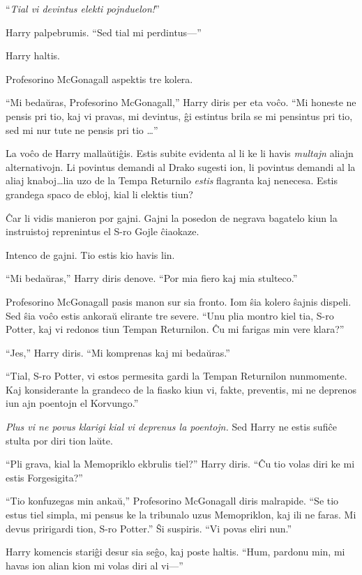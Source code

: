 ``\emph{Tial vi devintus elekti pojnduelon!}''

Harry palpebrumis. ``Sed tial mi perdintus—''

Harry haltis.

Profesorino McGonagall aspektis tre kolera.

``Mi bedaŭras, Profesorino McGonagall,'' Harry diris per eta
voĉo. ``Mi honeste ne pensis pri tio, kaj vi pravas, mi devintus, ĝi
estintus brila se mi pensintus pri tio, sed mi nur tute ne pensis pri
tio \ldots''

La voĉo de Harry mallaŭtiĝis. Estis subite evidenta al li ke li havis
\emph{multajn} aliajn alternativojn. Li povintus demandi al Drako
sugesti ion, li povintus demandi al la aliaj knaboj\ldots lia uzo de
la Tempa Returnilo \emph{estis} flagranta kaj nenecesa. Estis grandega
spaco de ebloj, kial li elektis tiun?

Ĉar li vidis manieron por gajni. Gajni la posedon de negrava bagatelo
kiun la instruistoj reprenintus el S-ro Gojle ĉiaokaze.

Intenco de gajni. Tio estis kio havis lin.

``Mi bedaŭras,'' Harry diris denove. ``Por mia fiero kaj mia stulteco.''

Profesorino McGonagall pasis manon sur sia fronto. Iom ŝia kolero
ŝajnis dispeli. Sed ŝia voĉo estis ankoraŭ elirante tre severe. ``Unu
plia montro kiel tia, S-ro Potter, kaj vi redonos tiun Tempan
Returnilon. Ĉu mi farigas min vere klara?''

``Jes,'' Harry diris. ``Mi komprenas kaj mi bedaŭras.''

``Tial, S-ro Potter, vi estos permesita gardi la Tempan Returnilon
nunmomente. Kaj konsiderante la grandeco de la fiasko kiun vi, fakte,
preventis, mi ne deprenos iun ajn poentojn el Korvungo.''

\emph{Plus vi ne povus klarigi kial vi deprenus la poentojn.} Sed
Harry ne estis sufiĉe stulta por diri tion laŭte.

``Pli grava, kial la Memopriklo ekbrulis tiel?'' Harry diris. ``Ĉu tio
volas diri ke mi estis Forgesigita?''

``Tio konfuzegas min ankaŭ,'' Profesorino McGonagall diris
malrapide. ``Se tio estus tiel simpla, mi pensus ke la tribunalo uzus
Memopriklon, kaj ili ne faras. Mi devus pririgardi tion, S-ro
Potter.'' Ŝi suspiris. ``Vi povas eliri nun.''

Harry komencis stariĝi desur sia seĝo, kaj poste haltis. ``Hum,
pardonu min, mi havas ion alian kion mi volas diri al vi—''

